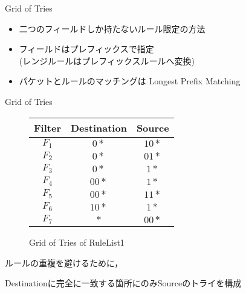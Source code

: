 \documentclass[a4paper,10pt]{jarticle}
\makeatletter
\newcommand{\tblcaption}[1]{\def\@captype{table}\caption{#1}}
\makeatother
\begin{document}
\begin{frame}{Grid of Tries}

 \begin{itemize}
  \item 二つのフィールドしか持たないルール限定の方法 \vspace{3mm}
  \item フィールドはプレフィックスで指定 \\ (レンジルールはプレフィックスルールへ変換) \vspace{3mm}
  \item パケットとルールのマッチングは Longest Prefix Matching
 \end{itemize}

\end{frame}

\begin{frame}{Grid of Tries}

\begin{figure}[h]
 \def\@captype{table}
 \begin{minipage}[t]{.3\textwidth}
  {\scriptsize
  {\centering
  \begin{tabular}{c|c|c} 
   Filter   & Destination & Source \\ \hline
   $F_{1} $ & $0*$        & $10*$   \\ \hline
   $F_{2} $ & $0*$        & $01*$   \\ \hline
   $F_{3} $ & $0*$        & $1*$   \\ \hline
   $F_{4} $ & $00*$       & $1*$   \\ \hline
   $F_{5} $ & $00*$       & $11*$   \\ \hline
   $F_{6} $ & $10*$       & $1*$   \\ \hline
   $F_{7} $ & $*$         & $00*$   
  \end{tabular}
  \tblcaption{RuleList1}

  }
  }
  \end{minipage}
  \hfill
  \begin{minipage}[c]{.6\textwidth}
   \vspace{8mm}
   \scalebox{0.45}{}
   \vspace{-6mm}
   \caption{Grid of Tries of RuleList1}
  \end{minipage}
\end{figure}

\vspace{3mm}

ルールの重複を避けるために，\par Destinationに完全に一致する箇所にのみSourceのトライを構成

\end{frame}
\end{document}
